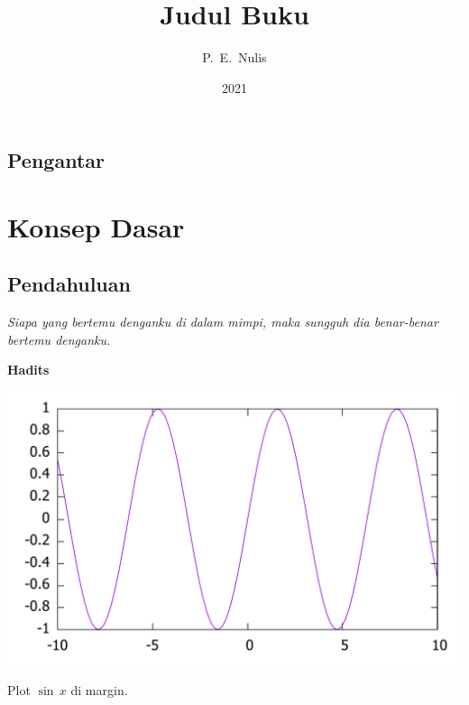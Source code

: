 \documentclass[12pt,justified,a4paper,twoside,symmetric,titlepage]{tufte-book}
\title{Judul Buku}
\author{P.~E.~Nulis}
\date{2021}
\begin{document}
\maketitle
\tableofcontents
{}
\listoffigures
{}
\listoftables
{}

\chapter*{Pengantar}
\lipsum

\part{Konsep Dasar}

\chapter{Pendahuluan}

\epigraph{\itshape Siapa yang bertemu denganku di dalam mimpi, maka sungguh dia benar-benar bertemu denganku.}{\bfseries Hadits}

\begin{marginfigure}
\label{gbrMargin}
\begin{center}
\includegraphics[width=\textwidth]{plotsinus.pdf}
\end{center}
\caption{Plot $\sin\,x$ di margin.}
\end{marginfigure}

\lipsum[1-3]
\end{document}
